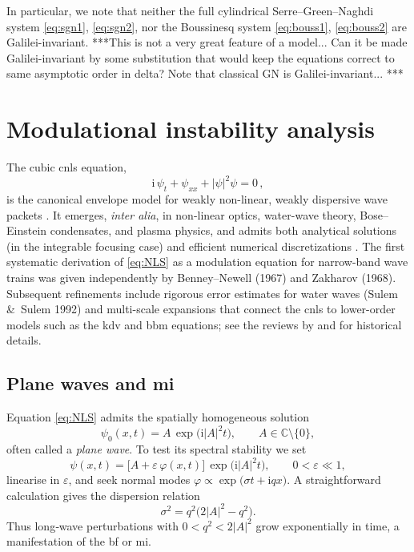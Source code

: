 \documentclass[alpha-refs, 12pt]{wiley-article}
\newcommand{\ui}{\mathrm{i}}
\newcommand{\eps}{\varepsilon}
\begin{document}
In particular, we note that neither the full cylindrical Serre–Green–Naghdi system \eqref{eq:sgn1}, \eqref{eq:sgn2}, nor the Boussinesq system \eqref{eq:bouss1}, \eqref{eq:bouss2} are Galilei-invariant. {\color{red}***This is not a very great feature of a model... Can it be made Galilei-invariant by some substitution that would keep the equations correct to same asymptotic order in delta? Note that classical GN is Galilei-invariant... ***}







\section{Modulational instability analysis}\label{sec:MI}

The cubic \acrfull{cnls} equation,
\begin{equation}\label{eq:NLS}
  \ui\,\psi_{t} + \psi_{xx} + |\psi|^{2}\psi = 0\,,
\end{equation}
is the canonical envelope model for weakly non-linear, weakly dispersive wave packets \citep{Sulem1999, Zakharov1972}. It emerges, \textit{inter alia}, in non-linear optics, water-wave theory, Bose--Einstein condensates, and plasma physics, and admits both analytical solutions (in the integrable focusing case) and efficient numerical discretizations \citep{Agrawal2013, Taha1984}. The first systematic derivation of \eqref{eq:NLS} as a modulation equation for narrow-band wave trains was given independently by Benney--Newell (1967) and Zakharov (1968). Subsequent refinements include rigorous error estimates for water waves (Sulem \&\ Sulem 1992) and multi-scale expansions that connect the \acrshort{cnls} to lower-order models such as the \acrshort{kdv} and \acrshort{bbm} equations; see the reviews by \cite{Peregrine1983} and \cite{Hammack1993} for historical details.

\subsection{Plane waves and \acrfull{mi}}

Equation \eqref{eq:NLS} admits the spatially homogeneous solution
\begin{equation}\label{eq:plane_wave}
  \psi_{0}(x,t)=A\,\exp\bigl(\mathrm{i}|A|^{2}t\bigr), \qquad A \in \mathds{C} \setminus \{0\},
\end{equation}
often called a \emph{plane wave}. To test its spectral stability we set
\[
  \psi(x,t)=\bigl[A+\eps\,\varphi(x,t)\bigr]\,\exp\bigl(\mathrm{i}|A|^{2}t\bigr), \qquad 0<\eps\ll1,
\]
linearise in $\eps$, and seek normal modes
\(
  \varphi\propto\exp\bigl(\sigma t+\mathrm{i}qx\bigr).
\)
A straightforward calculation gives the dispersion relation
\begin{equation}\label{eq:MI_disp}
  \sigma^{2}=q^{2}\bigl(2|A|^{2}-q^{2}\bigr).
\end{equation}
Thus long‐wave perturbations with
\(
  0<q^{2}<2|A|^{2}
\)
grow exponentially in time, a manifestation of the \acrfull{bf} or \acrfull{mi}.
\end{document}
